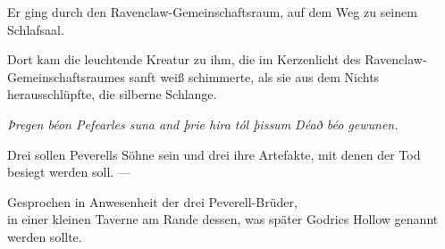 Er ging durch den Ravenclaw-Gemeinschaftsraum, auf dem Weg zu seinem Schlafsaal.

Dort kam die leuchtende Kreatur zu ihm, die im Kerzenlicht des Ravenclaw-Gemeinschaftsraumes sanft weiß schimmerte, als sie aus dem Nichts herausschlüpfte, die silberne Schlange.

\later

\begin{center}
\emph{Þregen béon Pefearles suna and þrie hira tól þissum Déað béo gewunen.}

Drei sollen Peverells Söhne sein und drei ihre Artefakte, mit denen der Tod besiegt werden soll. —

Gesprochen in Anwesenheit der drei Peverell-Brüder,\\
in einer kleinen Taverne am Rande dessen, was später Godrics Hollow genannt werden sollte.
\end{center}

